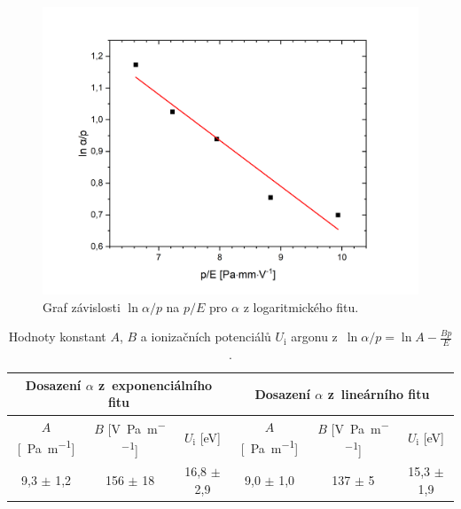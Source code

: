 \documentclass[a4paper,12pt]{article}
\begin{document}
\begin{figure}[h!]
	\centering
	\includegraphics[width=145mm]{lnposun.png}
	\caption{Graf závislosti $\ln \alpha/p$ na $p/E$ pro $\alpha$ z logaritmického fitu.}
	\label{lnposun}
\end{figure} 

\newpage
\begin{center}
	\begin{table}[h]
		\centering
		\caption{Hodnoty konstant $A$, $B$ a ionizačních potenciálů $U_\text{i}$ 
		argonu z~$\ln \alpha/p = \ln A - \frac{Bp}{E}$.}
		\label{tab2}
		\begin{tabular}{|c|c|c|c|c|c|} \hline
			\multicolumn{3}{|c|}{Dosazení $\alpha$ z~exponenciálního fitu} & \multicolumn{3}{c|}{Dosazení $\alpha$ z~lineárního fitu}  \\ \hline
			$A$ [\si{\per\pascal\per\meter}] & $B$ [\si{\volt\per\pascal\per\meter}] & $U_\text{i}$ [eV] & $A$ [\si{\per\pascal\per\meter}] & $B$ [\si{\volt\per\pascal\per\meter}] & $U_\text{i}$ [eV] \\ \hline
			9,3 $\pm$ 1,2 & 156 $\pm$ 18 &  16,8 $\pm$ 2,9  & 9,0 $\pm$ 1,0 & 
			137 $\pm$ 5 & 15,3 $\pm$ 1,9\\ \hline
		\end{tabular}
	\end{table}
\end{center}
\end{document}
